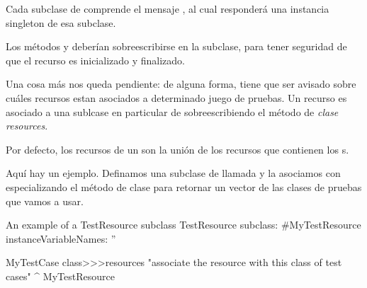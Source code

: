 \documentclass[a4paper,10pt,twoside]{book}
\begin{document}
Cada subclase de   comprende el mensaje , al cual responder\'a una instancia singleton de esa subclase.

Los m\'etodos  y  deber\'ian sobreescribirse en la subclase, para tener seguridad de que el
recurso es inicializado y finalizado. 

Una cosa m\'as nos queda pendiente: de alguna forma, \sunit tiene que ser avisado sobre cu\'ales recursos
estan asociados a determinado juego de pruebas.
Un recurso es asociado a una sublcase en particular de   sobreescribiendo el m\'etodo de \emph{clase}
\emph{resources}.


Por defecto, los recursos de un  son la uni\'on de los recursos que contienen los 
s. 

Aqu\'i hay un ejemplo.
Definamos una subclase de  llamada  y la asociamos con 
especializando el m\'etodo de clase  para retornar un vector de las clases de pruebas que vamos 
a usar.

\begin{classdef}[mytestresource]{An example of a TestResource subclass}
TestResource subclass: #MyTestResource
	instanceVariableNames: ''

MyTestCase class>>>resources
	"associate the resource with this class of test cases"
	^{ MyTestResource }
\end{classdef}





\end{document}
